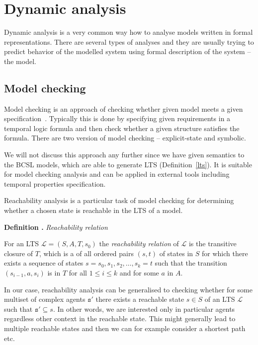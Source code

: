 \documentclass[12pt]{fithesis2}
\newcounter{counter}[section]
\renewcommand{\thecounter}{\thesection.\arabic{counter}}
\newenvironment{definition}[1]{\bigskip\refstepcounter{counter}\noindent\textbf{Definition \thecounter } \emph{#1} \par\nopagebreak \begin{itshape}}{\end{itshape}\bigskip}
\begin{document}
\section{Dynamic analysis}

Dynamic analysis is a very common way how to analyse models written in formal representations. There are several types of analyses and they are usually trying to predict behavior of the modelled system using formal description of the system -- the model.

\subsection{Model checking}

Model checking is an approach of checking whether given model meets a given specification~\cite{clarke1999model}. Typically this is done by specifying given requirements in a temporal logic formula and then check whether a given structure satisfies the formula. There are two version of model checking -- explicit-state and symbolic.

We will not discuss this approach any further since we have given semantics to the BCSL models, which are able to generate LTS (Definition~\ref{lts}). It is suitable for model checking analysis and can be applied in external tools including temporal properties specification.

Reachability analysis is a particular task of model checking for determining whether a chosen state is reachable in the LTS of a model.

\begin{definition}{Reachability relation}
\label{reachability_relation}
For an LTS $\mathcal{L} = (S, A, T, s_0)$ the \emph{reachability relation} of $\mathcal{L}$ is the transitive closure of $T$, which is a of all ordered pairs $(s,t)$ of states in $S$ for which there exists a sequence of states $s = s_0, s_1, s_2, \ldots, s_k = t$ such that the transition $(s_{i-1}, a, s_i)$ is in $T$ for all $1 \leq i \leq k$ and for some $a$ in $A$.
\end{definition}

In our case, reachability analysis can be generalised to checking whether for some multiset of complex agents $\mathtt{s}'$ there exists a reachable state $s \in S$ of an LTS $\mathcal{L}$ such that $\mathtt{s}' \subseteq s$. In other words, we are interested only in particular agents regardless other context in the reachable state. This might generally lead to multiple reachable states and then we can for example consider a shortest path etc.
\end{document}

